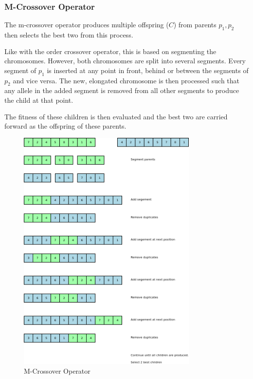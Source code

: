 \documentclass[10pt, a4paper]{article}
\begin{document}
\subsubsection{M-Crossover Operator}

The m-crossover operator\cite{Mudaliar2013Unraveling} produces multiple 
offspring ($C$) from parents $p_1, p_2$ then selects the best two from this 
process.

Like with the order crossover operator, this is based on segmenting the
chromosomes. However, both chromosomes are split into several segments. Every
segment of $p_1$ is inserted at any point in front, behind or between the
segments of $p_2$ and vice versa. The new, elongated chromosome is then
processed such that any allele in the added segment is removed from all other
segments to produce the child at that point.

The fitness of these children is then evaluated and the best two are carried 
forward as the offspring of these parents.

\begin{figure}[h]
\centering
\includegraphics[width=0.8\textwidth]{img/m-crossover-operator}
\caption{M-Crossover Operator}
\label{fig:m-crossover-operator}
\end{figure}
\end{document}
